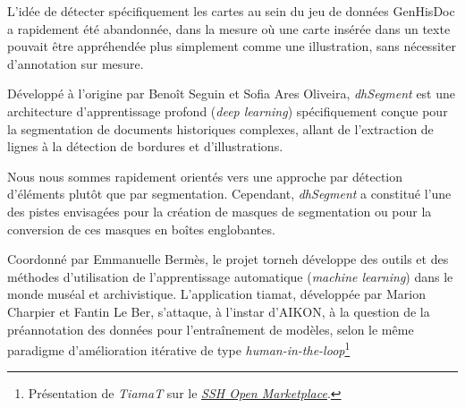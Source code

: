 \begin{description}
        L'idée de détecter spécifiquement les cartes au sein du jeu de données GenHisDoc a rapidement été abandonnée, dans la mesure où une carte insérée dans un texte pouvait être appréhendée plus simplement comme une illustration, sans nécessiter d'annotation sur mesure.
        
        \item[dhSegment / Digital Humanities Laboratory :] Développé à l'origine par Benoît Seguin et Sofia Ares Oliveira, \textit{dhSegment} est une architecture d'apprentissage profond (\textit{deep learning}) spécifiquement conçue pour la segmentation de documents historiques complexes, allant de l'extraction de lignes à la détection de bordures et d'illustrations.
        
        Nous nous sommes rapidement orientés vers une approche par détection d'éléments plutôt que par segmentation. Cependant, \textit{dhSegment} a constitué l'une des pistes envisagées pour la création de masques de segmentation ou pour la conversion de ces masques en boîtes englobantes.

        \item[TORNE-H / École nationale des chartes \& Musée des arts décoratifs :] Coordonné par Emmanuelle Bermès, le projet \gls{torneh} développe des outils et des méthodes d'utilisation de l'apprentissage automatique (\textit{machine learning}) dans le monde muséal et archivistique. L'application \gls{tiamat}, développée par Marion Charpier et Fantin Le Ber, s'attaque, à l'instar d'AIKON, à la question de la préannotation des données pour l'entraînement de modèles, selon le même paradigme d'amélioration itérative de type \textit{human-in-the-loop}\footnote{Présentation de \textit{TiamaT} sur le \href{https://marketplace.sshopencloud.eu/tool-or-service/lYN2OC}{\textit{SSH Open Marketplace}}.}
        
\end{description}